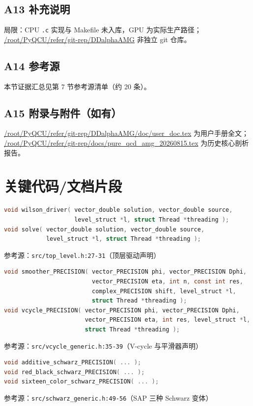 \documentclass[UTF8]{ctexart}
\begin{document}
\subsection{A13 补充说明}
\textcolor{warn}{局限：}CPU \texttt{.c} 实现与 Makefile 未入库，GPU 为实际生产路径；
\url{/root/PyQCU/refer/git-rep/DDalphaAMG} 非独立 git 仓库。

\subsection{A14 参考源}
本节证据汇总见第 7 节参考源清单（约 20 条）。

\subsection{A15 附录与附件（如有）}
\url{/root/PyQCU/refer/git-rep/DDalphaAMG/doc/user_doc.tex} 为用户手册全文；
\url{/root/PyQCU/refer/git-rep/docs/pure_qcd_amg_20260815.tex} 为历史核心剖析报告。

\section{关键代码/文档片段}

\begin{lstlisting}[language=C]
void wilson_driver( vector_double solution, vector_double source,
                    level_struct *l, struct Thread *threading );
void solve( vector_double solution, vector_double source,
            level_struct *l, struct Thread *threading );
\end{lstlisting}
参考源：\texttt{src/top\_level.h:27-31}（顶层驱动声明）

\begin{lstlisting}[language=C]
void smoother_PRECISION( vector_PRECISION phi, vector_PRECISION Dphi,
                         vector_PRECISION eta, int n, const int res,
                         complex_PRECISION shift, level_struct *l,
                         struct Thread *threading );
void vcycle_PRECISION( vector_PRECISION phi, vector_PRECISION Dphi,
                       vector_PRECISION eta, int res, level_struct *l,
                       struct Thread *threading );
\end{lstlisting}
参考源：\texttt{src/vcycle\_generic.h:35-39}（V-cycle 与平滑器声明）

\begin{lstlisting}[language=C]
void additive_schwarz_PRECISION( ... );
void red_black_schwarz_PRECISION( ... );
void sixteen_color_schwarz_PRECISION( ... );
\end{lstlisting}
参考源：\texttt{src/schwarz\_generic.h:49-56}（SAP 三种 Schwarz 变体）
\end{document}
